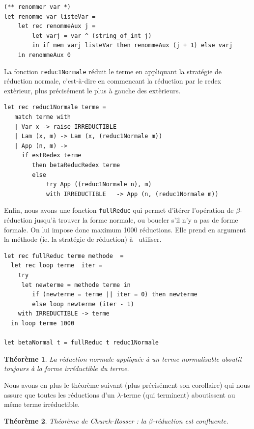 \documentclass[11pt]{book}
\newtheorem{theoreme}{Théorème}
\begin{document}
\begin{Verbatim}
(** renommer var *)
let renomme var listeVar =
	let rec renommeAux j =
		let varj = var ^ (string_of_int j)
		in if mem varj listeVar then renommeAux (j + 1) else varj
	in renommeAux 0
\end{Verbatim}

La fonction \texttt{reduc1Normale}  r\'{e}duit le terme en appliquant la strat\'{e}gie de r\'{e}duction normale, c'est-\`{a}-dire
en commencant la r\'{e}duction par le redex ext\`{e}rieur, plus pr\'{e}cis\'{e}ment le plus \`{a} gauche des ext\`{e}rieurs.



\begin{Verbatim}
let rec reduc1Normale terme =
   match terme with
   | Var x -> raise IRREDUCTIBLE 
   | Lam (x, m) -> Lam (x, (reduc1Normale m))
   | App (n, m) ->
	 if estRedex terme
		then betaReducRedex terme
		else
			try App ((reduc1Normale n), m)
			with IRREDUCTIBLE   -> App (n, (reduc1Normale m)) 
\end{Verbatim}

Enfin, nous avons une fonction \verb+fullReduc+ qui permet d'itérer l'opération de
$\beta$-réduction jusqu'à trouver la forme normale, ou boucler s'il n'y a pas de forme formale.
On lui impose donc maximum 1000 réductions. 
Elle prend en argument la méthode (ie. la stratégie de réduction) à  utiliser. 

\begin{Verbatim}
let rec fullReduc terme methode  =
  let rec loop terme  iter =
	try
	 let newterme = methode terme in
		if (newterme = terme || iter = 0) then newterme
		else loop newterme (iter - 1)
	with IRREDUCTIBLE -> terme	
  in loop terme 1000
	
let betaNormal t = fullReduc t reduc1Normale
\end{Verbatim}

\begin{theoreme}
La réduction normale appliquée à un terme normalisable aboutit toujours à la forme irréductible du terme.
\end{theoreme}

Nous avons en plus le théorème suivant (plus précisément son corollaire) qui nous assure que toutes les réductions d'un $\lambda$-terme (qui terminent) aboutissent au m\^{e}me
terme irréductible.



\begin{theoreme}
Théorème de Church-Rosser : la $\beta $-réduction est confluente.
\end{theoreme}
\end{document}
